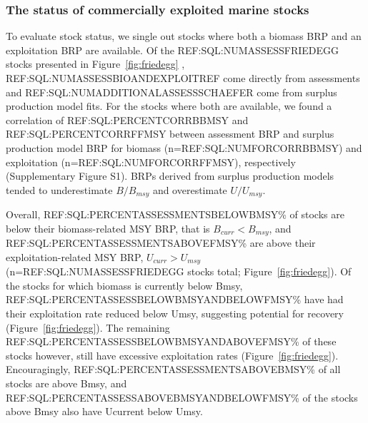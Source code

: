 
\subsubsection*{The status of commercially exploited marine stocks }
To evaluate stock status, we single out stocks where both a biomass
BRP and an exploitation BRP are available. Of the
REF:SQL:NUMASSESSFRIEDEGG stocks presented in
Figure~\ref{fig:friedegg} , REF:SQL:NUMASSESSBIOANDEXPLOITREF come
directly from assessments and REF:SQL:NUMADDITIONALASSESSSCHAEFER come
from surplus production model fits. For the stocks where both are
available, we found a correlation of REF:SQL:PERCENTCORRBBMSY and
REF:SQL:PERCENTCORRFFMSY between assessment BRP and surplus production
model BRP for biomass (n=REF:SQL:NUMFORCORRBBMSY) and exploitation (n=REF:SQL:NUMFORCORRFFMSY), respectively (Supplementary
Figure S1). BRPs derived from surplus production models tended to
underestimate $B/B_{msy}$ and overestimate $U/U_{msy}$.

Overall, REF:SQL:PERCENTASSESSMENTSBELOWBMSY\% of stocks are below
their biomass-related MSY BRP, that is $B_{curr}<B_{msy}$, and
REF:SQL:PERCENTASSESSMENTSABOVEFMSY\% are above their
exploitation-related MSY BRP, $U_{curr}>U_{msy}$
(n=REF:SQL:NUMASSESSFRIEDEGG stocks total; Figure~\ref{fig:friedegg}).
Of the stocks for which biomass is currently below Bmsy,
REF:SQL:PERCENTASSESSBELOWBMSYANDBELOWFMSY\% have had their
exploitation rate reduced below Umsy, suggesting potential for
recovery (Figure~\ref{fig:friedegg}). The remaining
REF:SQL:PERCENTASSESSBELOWBMSYANDABOVEFMSY\% of these stocks however,
still have excessive exploitation rates (Figure~\ref{fig:friedegg}).
Encouragingly, REF:SQL:PERCENTASSESSMENTSABOVEBMSY\% of all stocks are
above Bmsy, and REF:SQL:PERCENTASSESSABOVEBMSYANDBELOWFMSY\% of the
stocks above Bmsy also have Ucurrent below Umsy. 





